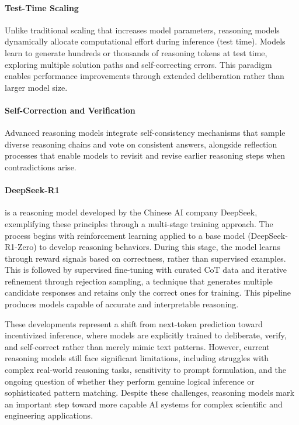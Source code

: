 \paragraph{Test-Time Scaling}
Unlike traditional scaling that increases model parameters, reasoning models dynamically allocate computational effort during inference (test time). 
Models learn to generate hundreds or thousands of reasoning tokens at test time, exploring multiple solution paths and self-correcting errors. 
This paradigm enables performance improvements through extended deliberation rather than larger model size.

\paragraph{Self-Correction and Verification}
Advanced reasoning models integrate self-consistency mechanisms that sample diverse reasoning chains and vote on consistent answers, alongside reflection processes that enable models to revisit and revise earlier reasoning steps when contradictions arise.

\paragraph{DeepSeek-R1 \cite{deepseekr1-report}} 
is a reasoning model developed by the Chinese AI company DeepSeek, exemplifying these principles through a multi-stage training approach.
The process begins with reinforcement learning applied to a base model (DeepSeek-R1-Zero) to develop reasoning behaviors. 
During this stage, the model learns through reward signals based on correctness, rather than supervised examples. 
This is followed by supervised fine-tuning with curated CoT data and iterative refinement through rejection sampling, a technique that generates multiple candidate responses and retains only the correct ones for training. 
This pipeline produces models capable of accurate and interpretable reasoning.

\vspace{\baselineskip}
These developments represent a shift from next-token prediction toward incentivized inference, where models are explicitly trained to deliberate, verify, and self-correct rather than merely mimic text patterns. 
However, current reasoning models still face significant limitations, including struggles with complex real-world reasoning tasks, sensitivity to prompt formulation, and the ongoing question of whether they perform genuine logical inference or sophisticated pattern matching. 
Despite these challenges, reasoning models mark an important step toward more capable AI systems for complex scientific and engineering applications.


